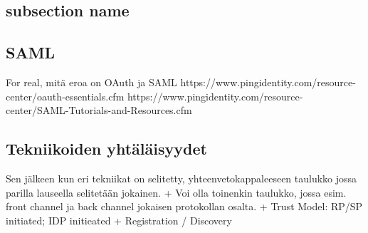 \documentclass[english,gradu]{tktltiki}
\begin{document}

  \subsection{subsection name} %
  \label{sub:subsection_name}

  \subsection{SAML} %
  \label{sub:saml}
  For real, mitä eroa on OAuth ja SAML
  https://www.pingidentity.com/resource-center/oauth-essentials.cfm
  https://www.pingidentity.com/resource-center/SAML-Tutorials-and-Resources.cfm


  \subsection{Tekniikoiden yhtäläisyydet} %
  \label{sub:tekniikoiden_yhtäläisyydet}

  Sen jälkeen kun eri tekniikat on selitetty, yhteenvetokappaleeseen taulukko jossa parilla lauseella selitetään jokainen.
  + Voi olla toinenkin taulukko, jossa esim. front channel ja back channel jokaisen protokollan osalta.
  + Trust Model: RP/SP initiated; IDP initieated %
  + Registration / Discovery %

\end{document}
